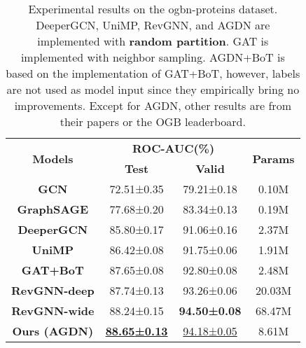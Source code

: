\documentclass{article}
\begin{document}
\begin{table}[hbt]
\caption{Experimental results on the ogbn-proteins dataset. DeeperGCN, UniMP, RevGNN, and AGDN are implemented with \textbf{random partition}. GAT is implemented with neighbor sampling. AGDN+BoT is based on the implementation of GAT+BoT, however, labels are not used as model input since they empirically bring no improvements. Except for AGDN, other results are from their papers or the OGB leaderboard.}
\begin{center}
\begin{tabular}[l]{c|cc|c}
\toprule[1pt]
\multirow{2}{*}{\textbf{Models}} & \multicolumn{2}{c|}{\textbf{ROC-AUC(\%)}} & \multirow{2}{*}{\textbf{Params}} \\ 
 & \textbf{Test} & \textbf{Valid} & \\
\midrule
\textbf{GCN}  & 72.51\scriptsize{±0.35} & 79.21\scriptsize{±0.18} & 0.10M \\ 
\textbf{GraphSAGE} & 77.68\scriptsize{±0.20} & 83.34\scriptsize{±0.13} & 0.19M \\ 
\textbf{DeeperGCN} & 85.80\scriptsize{±0.17} & 91.06\scriptsize{±0.16} & 2.37M \\
\textbf{UniMP} & 86.42\scriptsize{±0.08} & 91.75\scriptsize{±0.06} & 1.91M \\
\textbf{GAT+BoT} & 87.65\scriptsize{±0.08} & 92.80\scriptsize{±0.08} & 2.48M \\ 
\textbf{RevGNN-deep} & 87.74\scriptsize{±0.13} & 93.26\scriptsize{±0.06} & 20.03M \\
\textbf{RevGNN-wide} & 88.24\scriptsize{±0.15} & \textbf{94.50\scriptsize{±0.08}} & 68.47M \\ 
\textbf{Ours (AGDN)} & \underline{\textbf{88.65\scriptsize{±0.13}}} & \underline{94.18\scriptsize{±0.05}} & 8.61M \\ 
\bottomrule[1pt]
\end{tabular}
\end{center}
\label{tab: experiments on ogbn-proteins}
\end{table}
\end{document}
